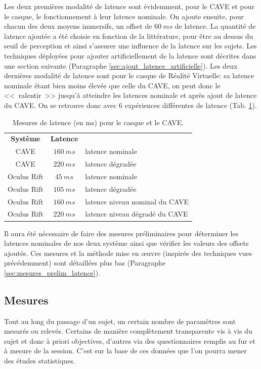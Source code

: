 	\par Les deux premières modalité de latence sont évidemment, pour le CAVE et pour le casque, le fonctionnement à leur latence nominale. On ajoute ensuite, pour chacun des deux moyens immersifs, un offset de $60~ms$ de latence. La quantité de latence ajoutée a été choisie en fonction de la littérature, pour être au dessus du seuil de perception et ainsi s'assurer une influence de la latence sur les sujets. Les techniques déployées pour ajouter artificiellement de la latence sont décrites dans une section suivante (Paragraphe \ref{sec:ajout_latence_artificielle}). Les deux dernières modalité de latence sont pour le casque de Réalité Virtuelle: sa latence nominale étant bien moins élevée que celle du CAVE, on peut donc le <<~ralentir~>> jusqu'à atteindre les latences nominale et après ajout de latence du CAVE. On se retrouve donc avec 6 expériences différentes de latence (Tab. \ref{tab:latence_casque_cave_expe}).
	
	\begin{table}[h]	
		\centering
		\caption{Mesures de latence (en ms) pour le casque et le CAVE.}
		\label{tab:latence_casque_cave_expe}
		\begin{tabular}{c|c|l}
			\textbf{Système} & \textbf{Latence}\\
			CAVE & $160~ms$ & latence nominale\\
			CAVE & $220~ms$ & latence dégradée\\
			Oculus Rift & $45~ms$ & latence nominale\\
			Oculus Rift & $105~ms$ & latence dégradée\\
			Oculus Rift & $160~ms$ & latence niveau nominal du CAVE\\
			Oculus Rift & $220~ms$ & latence niveau dégradé du CAVE\\
		\end{tabular}
	\end{table}
	
	\par Il aura été nécessaire de faire des mesures préliminaires pour déterminer les latences nominales de nos deux système ainsi que vérifier les valeurs des offsets ajoutés. Ces mesures et la méthode mise en œuvre (inspirée des techniques vues précédemment) sont détaillées plus bas (Paragraphe \ref{sec:mesures_prelim_latence}).
	
	\subsection{Mesures}
	\par Tout au long du passage d'un sujet, un certain nombre de paramètres sont mesurés ou relevés. Certains de manière complètement transparente vis à vis du sujet et donc à priori objectives, d'autres via des questionnaires remplis au fur et à mesure de la session. C'est sur la base de ces données que l'on pourra mener des études statistiques.
	
